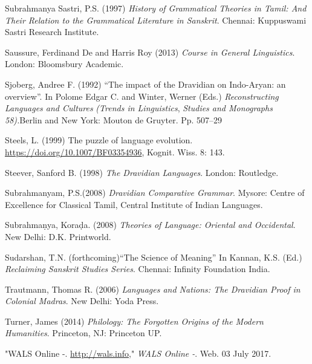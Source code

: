 \begin{thebibliography}{99}
  Subrahmanya Sastri, P.S. (1997) \textit{History of Grammatical Theories in Tamil: And Their Relation to the Grammatical Literature in Sanskrit}. Chennai: Kuppuswami Sastri Research Institute.

  Saussure, Ferdinand De and Harris Roy (2013) \textit{Course in General Linguistics}. London: Bloomsbury Academic.

  Sjoberg, Andree F. (1992) “The impact of the Dravidian on Indo-Aryan: an overview”. In Polome Edgar C. and Winter, Werner (Eds.) \textit{Reconstructing Languages and Cultures} \textit{(Trends in Linguistics}, \textit{Studies and Monographs 58).}Berlin and New York: Mouton de Gruyter. Pp. 507–29

  Steels, L. (1999) The puzzle of language evolution. \url{ https://doi.org/10.1007/BF03354936}, Kognit. Wiss. 8: 143.

  Steever, Sanford B. (1998) \textit{The Dravidian Languages}. London: Routledge.

  Subrahmanyam, P.S.(2008) \textit{Dravidian Comparative Grammar}. Mysore: Centre of Excellence for Classical Tamil, Central Institute of Indian Languages.

  Subrahmaṇya, Koraḍa. (2008) \textit{Theories of Language: Oriental and Occidental}. New Delhi: D.K. Printworld.

  Sudarshan, T.N. (forthcoming)“The Science of Meaning” In Kannan, K.S. (Ed.) \textit{Reclaiming Sanskrit Studies Series}. Chennai: Infinity Foundation India.

  Trautmann, Thomas R. (2006) \textit{Languages and Nations: The Dravidian Proof in Colonial Madras}. New Delhi: Yoda Press.

  Turner, James (2014) \textit{Philology: The Forgotten Origins of the Modern Humanities}. Princeton, NJ: Princeton UP.

  "WALS Online -. \url{http://wals.info}," \textit{WALS Online -}. Web. 03 July 2017.

 \end{thebibliography}

